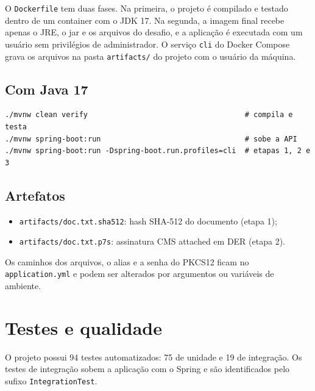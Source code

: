 \documentclass[12pt,a4paper]{article}
\begin{document}
O \texttt{Dockerfile} tem duas fases. Na primeira, o projeto é compilado e testado dentro de um container com o JDK 17. Na segunda, a imagem final recebe apenas o JRE, o jar e os arquivos do desafio, e a aplicação é executada com um usuário sem privilégios de administrador. O serviço \texttt{cli} do Docker Compose grava os arquivos na pasta \texttt{artifacts/} do projeto com o usuário da máquina.

\subsection{Com Java 17}

\begin{lstlisting}
./mvnw clean verify                                    # compila e testa
./mvnw spring-boot:run                                 # sobe a API
./mvnw spring-boot:run -Dspring-boot.run.profiles=cli  # etapas 1, 2 e 3
\end{lstlisting}

\subsection{Artefatos}

\begin{itemize}
    \item \texttt{artifacts/doc.txt.sha512}: hash SHA-512 do documento (etapa 1);
    \item \texttt{artifacts/doc.txt.p7s}: assinatura CMS attached em DER (etapa 2).
\end{itemize}

Os caminhos dos arquivos, o alias e a senha do PKCS12 ficam no \texttt{application.yml} e podem ser alterados por argumentos ou variáveis de ambiente.

\section{Testes e qualidade}

O projeto possui 94 testes automatizados: 75 de unidade e 19 de integração. Os testes de integração sobem a aplicação com o Spring e são identificados pelo sufixo \texttt{IntegrationTest}.
\end{document}
